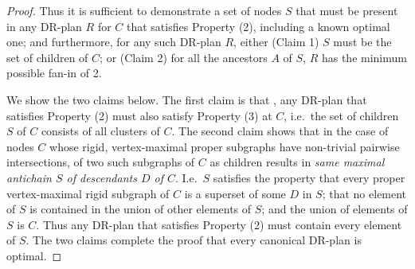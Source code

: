 \begin{proof}
Thus it is sufficient to demonstrate a set of nodes $S$  that must be present in any  DR-plan $R$ for $C$ that satisfies Property (2), including a known optimal one; and furthermore, for any such DR-plan $R$,  either (Claim 1) $S$ must be the set of children of $C$; or (Claim 2) for all the ancestors $A$ of $S$, $R$ has the minimum possible fan-in of 2.

We show the two claims below.
The first claim is that , any DR-plan   that satisfies Property (2) must also satisfy Property (3) at $C$, i.e.\ the set of children $S$ of $C$ consists of all clusters of $C$.
The second claim shows that in the case of nodes $C$ whose rigid, vertex-maximal proper subgraphs have  non-trivial pairwise intersections,  of two such subgraphs of $C$ as children  results in      {\em same maximal antichain $S$ of descendants $D$ of $C$}.  I.e.\ $S$ satisfies the property that every proper vertex-maximal rigid subgraph of $C$ is a superset of some $D$ in $S$;  that no element of $S$ is contained in the union of other elements of $S$; and the union of elements of $S$ is $C$. Thus any  DR-plan   that satisfies Property (2)  must  contain every element of $S$. The two claims complete the proof that every canonical
DR-plan is optimal.











\end{proof}
